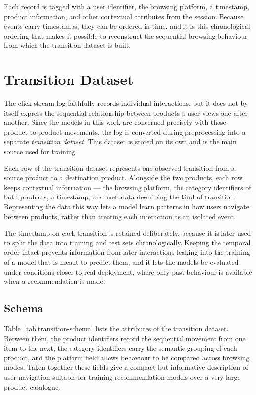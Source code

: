 Each record is tagged with a user identifier, the browsing platform, a
timestamp, product information, and other contextual attributes from the
session. Because events carry timestamps, they can be ordered in time, and it is
this chronological ordering that makes it possible to reconstruct the sequential
browsing behaviour from which the transition dataset is built.

\section{Transition Dataset}
\label{sec:transition-data}

The click stream log faithfully records individual interactions, but it does not
by itself express the sequential relationship between products a user views one
after another. Since the models in this work are concerned precisely with those
product-to-product movements, the log is converted during preprocessing into a
separate \emph{transition dataset}. This dataset is stored on its own and is the
main source used for training.

Each row of the transition dataset represents one observed transition from a
source product to a destination product. Alongside the two products, each row
keeps contextual information --- the browsing platform, the category identifiers
of both products, a timestamp, and metadata describing the kind of transition.
Representing the data this way lets a model learn patterns in how users navigate
between products, rather than treating each interaction as an isolated event.

The timestamp on each transition is retained deliberately, because it is later
used to split the data into training and test sets chronologically. Keeping the
temporal order intact prevents information from later interactions leaking into
the training of a model that is meant to predict them, and it lets the models be
evaluated under conditions closer to real deployment, where only past behaviour
is available when a recommendation is made.

\subsection{Schema}
\label{sec:transition-schema}
Table~\ref{tab:transition-schema} lists the attributes of the transition
dataset. Between them, the product identifiers record the sequential movement
from one item to the next, the category identifiers carry the semantic grouping
of each product, and the platform field allows behaviour to be compared across
browsing modes. Taken together these fields give a compact but informative
description of user navigation suitable for training recommendation models over
a very large product catalogue.

